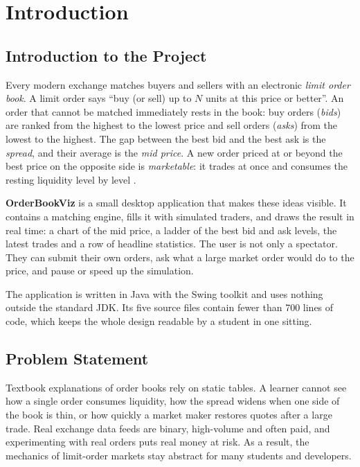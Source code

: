 \documentclass[12pt,a4paper,openany,oneside]{report}
\newcommand{\projectTitle}{OrderBookViz}
\begin{document}
\cleardoublepage
{}
\chapter{Introduction}

\section{Introduction to the Project}

Every modern exchange matches buyers and sellers with an electronic \emph{limit order book}. A limit order says ``buy (or sell) up to $N$ units at this price or better''. An order that cannot be matched immediately rests in the book: buy orders (\emph{bids}) are ranked from the highest to the lowest price and sell orders (\emph{asks}) from the lowest to the highest. The gap between the best bid and the best ask is the \emph{spread}, and their average is the \emph{mid price}. A new order priced at or beyond the best price on the opposite side is \emph{marketable}: it trades at once and consumes the resting liquidity level by level \cite{harris2003,gould2013}.

\textbf{\projectTitle} is a small desktop application that makes these ideas visible. It contains a matching engine, fills it with simulated traders, and draws the result in real time: a chart of the mid price, a ladder of the best bid and ask levels, the latest trades and a row of headline statistics. The user is not only a spectator. They can submit their own orders, ask what a large market order would do to the price, and pause or speed up the simulation.

The application is written in Java with the Swing toolkit \cite{swingtutorial} and uses nothing outside the standard JDK. Its five source files contain fewer than 700 lines of code, which keeps the whole design readable by a student in one sitting.

\section{Problem Statement}

Textbook explanations of order books rely on static tables. A learner cannot see how a single order consumes liquidity, how the spread widens when one side of the book is thin, or how quickly a market maker restores quotes after a large trade. Real exchange data feeds are binary, high-volume and often paid, and experimenting with real orders puts real money at risk. As a result, the mechanics of limit-order markets stay abstract for many students and developers.
\end{document}
